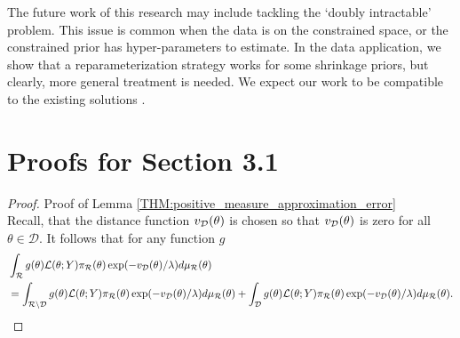 \documentclass[10pt,fleqn]{article} \pdfoutput=1
\DeclareMathOperator{\1}{\mathbbm{1}} \DeclareMathOperator{\bigO}{\mc O}
\begin{document}
The future work of this research may include tackling the  `doubly
intractable' problem. This issue is common when the data is on the
constrained space, or the constrained prior has hyper-parameters to
estimate. In the data application, we show that a reparameterization
strategy works for some shrinkage priors, but clearly, more general
treatment is needed. We expect our work to be compatible to the existing
solutions \citep{murray2012mcmc,rao2016data, stoehr2017noisy}.

\appendix



\section{Proofs for Section 3.1}
\label{APP:Positive_Measure_Convergence_Proofs} \begin{proof}{Proof of
		Lemma \ref{THM:positive_measure_approximation_error}} \\ Recall,
	that the distance function $v_{\mathcal{D}}(\theta)$ is chosen so that
	$v_{\mathcal{D}}(\theta)$ is zero for all $\theta\in \mathcal{D}$. It follows
	that for any function $g$ \begin{equation} \begin{split}
			&\int_{\mathcal{R}}  g(\theta)
			\mathcal{L}(\theta;Y)\pi_\mathcal{R}(\theta)\exp(-v_{\mathcal{D}}(\theta)/\lambda)
			d\mu_\mathcal{R}(\theta) \\ &=  \int_{\mathcal{R}\setminus
				\mathcal{D}}g(\theta)
			\mathcal{L}(\theta;Y)\pi_\mathcal{R}(\theta)\exp(-v_{\mathcal{D}}(\theta)/\lambda)
			d\mu_\mathcal{R}(\theta) + \int_{ \mathcal{D}} g(\theta)
			\mathcal{L}(\theta;Y)\pi_\mathcal{R}(\theta)\exp(-v_{\mathcal{D}}(\theta)/\lambda)
			d\mu_\mathcal{R}(\theta) .  \end{split} \end{equation}


\end{proof}
\end{document}
